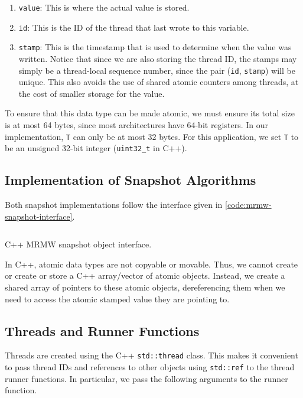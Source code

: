 \documentclass[conference,compsoc]{IEEEtran}
\begin{document}
\begin{enumerate}
    \item \texttt{value}: This is where the actual value is stored.
    \item \texttt{id}: This is the ID of the thread that last wrote to this
    variable.
    \item \texttt{stamp}: This is the timestamp that is used to determine when
    the value was written. Notice that since we are also storing the thread ID,
    the stamps may simply be a thread-local sequence number, since the pair
    (\texttt{id}, \texttt{stamp}) will be unique. This also avoids the use of
    shared atomic counters among threads, at the cost of smaller storage for the
    value.
\end{enumerate}

To ensure that this data type can be made atomic, we must ensure its total size
is at most 64 bytes, since most architectures have 64-bit registers. In our
implementation, \texttt{T} can only be at most 32 bytes. For this application,
we set \texttt{T} to be an unsigned 32-bit integer (\texttt{uint32\_t} in C++).

\subsection{Implementation of Snapshot Algorithms}
\label{subsec:snap-interface}

Both snapshot implementations follow the interface given in
\autoref{code:mrmw-snapshot-interface}.

\begin{listing}[!ht]
\inputminted{cpp}{codes/Snapshot.cpp}
\caption{C++ MRMW snapshot object interface.}
\label{code:mrmw-snapshot-interface}
\end{listing}

In C++, atomic data types are not copyable or movable. Thus, we cannot create or
create or store a C++ array/vector of atomic objects. Instead, we create a
shared array of pointers to these atomic objects, dereferencing them when we
need to access the atomic stamped value they are pointing to.

\subsection{Threads and Runner Functions}
\label{subsec:threads-and-runners}
Threads are created using the C++ \texttt{std::thread} class. This makes it
convenient to pass thread IDs and references to other objects using
\texttt{std::ref} to the thread runner functions. In particular, we pass the
following arguments to the runner function.
\end{document}
